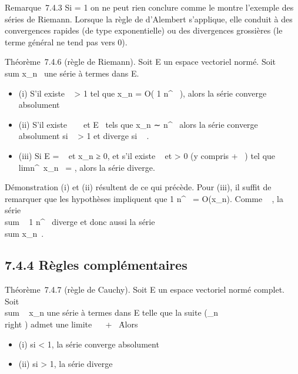 \documentclass[]{article}
\begin{document}
Remarque~7.4.3 Si \ell = 1 on ne peut rien conclure comme le montre
l'exemple des séries de Riemann. Lorsque la règle de d'Alembert
s'applique, elle conduit à des convergences rapides (de type
exponentielle) ou des divergences grossières (le terme général ne tend
pas vers 0).

Théorème~7.4.6 (règle de Riemann). Soit E un espace vectoriel normé.
Soit \\sum  x_n~
une série à termes dans E.

\begin{itemize}
\itemsep1pt\parskip0pt
\item
  (i) S'il existe \alpha~ > 1 tel que x_n = O( 1
  \over n^\alpha~ ), alors la série converge
  absolument
\item
  (ii) S'il existe \alpha~ \in {}~ et \ell \in E \diagdown\0\
  tels que x_n ∼ \ell \over n^\alpha~
  alors la série converge absolument si \alpha~ > 1 et diverge si
  \alpha~ \leq 1.
\item
  (iii) Si E = ~ et x_n ≥ 0, et s'il existe \alpha~  et \ell
  > 0 (y compris + \infty~) tel que
  limn^\alpha~x_n~ = \ell, alors la
  série diverge.
\end{itemize}

Démonstration (i) et (ii) résultent de ce qui précède. Pour (iii), il
suffit de remarquer que les hypothèses impliquent que  1
\over n^\alpha~ = O(x_n). Comme \alpha~ , la
série \\sum ~  1
\over n^\alpha~ diverge et donc aussi la série
\\sum  x_n~.

\subsection{7.4.4 Règles complémentaires}

Théorème~7.4.7 (règle de Cauchy). Soit E un espace vectoriel normé
complet. Soit \\sum ~
x_n une série à termes dans E telle que la suite
\left
(\rootn\of\x_n\\right
) admet une limite \ell \in {}~ \cup\ + \infty~\.
Alors

\begin{itemize}
\itemsep1pt\parskip0pt
\item
  (i) si \ell < 1, la série converge absolument
\item
  (ii) si \ell > 1, la série diverge
\end{itemize}
\end{document}

